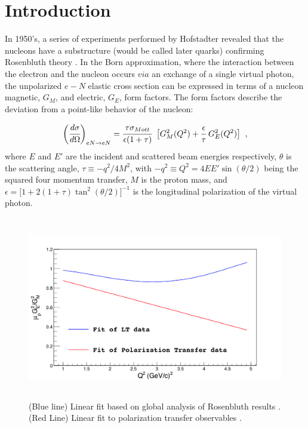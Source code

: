 \documentclass[11pt]{article}
\begin{document}
\section{Introduction}\label{sec:sec1}

In 1950's, a series of experiments performed by Hofstadter \cite{hof} revealed that the nucleons have a substructure (would be called later quarks) confirming Rosenbluth theory \cite{rosen}. 
In the Born approximation, where the interaction between the electron and the nucleon occurs $via$ an exchange of a single virtual photon, the unpolarized $e-N$ elastic cross section can be expressed in terms of a nucleon magnetic, $G_M$, and electric, $G_E$, form factors. The form factors describe the deviation from a point-like behavior of the nucleon:  

\begin{equation}\label{eq:1}
\bigg(\cfrac{d\sigma}{ d\Omega}\bigg)_{eN\rightarrow eN}  = \cfrac{\tau \sigma_{Mott}}{\epsilon(1+\tau)}\;\; \big[G^{2}_{M}(Q^2) + \cfrac{\epsilon}{\tau} \; G^{2}_{E}(Q^2)\big] \;\; ,
\end{equation}
 where $E$ and $E'$ are the incident and scattered beam energies respectively, $\theta$ is the scattering angle, $\tau \equiv -q^{2}/4M^{2}$,  with $-q^2 \equiv Q^2 = 4EE'\sin{(\theta/2)}$ being the squared four momentum transfer, $M$ is the proton mass, and $\epsilon = \big[ 1 + 2(1+\tau) \tan^2{(\theta/2)} \big]^{-1}$ is the longitudinal polarization of the virtual photon.\par
 \begin{figure}[h]
\begin{center}
  \includegraphics[width=12cm,height=8cm]{TPE.png}
  \caption{(Blue line) Linear fit based on global analysis of Rosenbluth results \cite{john}. (Red Line) Linear fit  to polarization transfer observables \cite{gayou}. }
  \label{fig:TPE}
  \end{center}
\end{figure}
\end{document}
